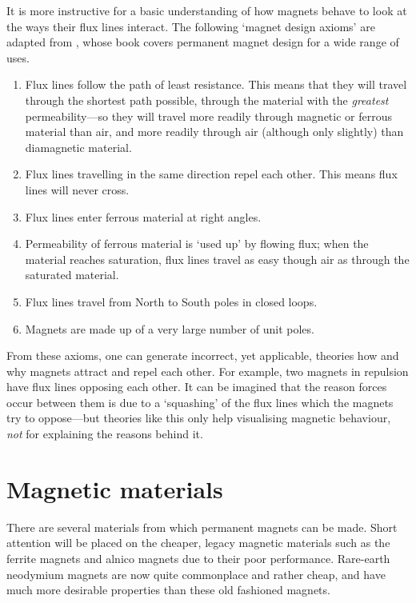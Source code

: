 It is more instructive for a basic understanding of how magnets behave
to look at the ways their flux lines interact. The following `magnet
design axioms' are adapted from \textcite{moskowitz1995}, whose book
covers permanent magnet design for a wide range of uses.

\begin{enumerate}
\item Flux lines follow the path of least resistance. This means that they will
travel through the shortest path possible,
through the material with the
\emph{greatest} permeability---so they will travel more readily through
magnetic or ferrous material than air, and more readily through air
(although only slightly) than diamagnetic material.

\item Flux lines travelling in the same direction repel each other. This means
flux lines will never cross.

\item Flux lines enter ferrous material at right angles.

\item Permeability of ferrous material is `used up' by flowing flux; when the
material reaches saturation, flux lines travel as easy though air as through
the saturated material.

\item Flux lines travel from North to South poles in closed loops.

\item Magnets are made up of a very large number of unit poles.
\end{enumerate}

From these axioms, one can generate incorrect, yet applicable,
theories how and why magnets attract and repel each other. For
example, two magnets in repulsion have flux lines opposing each
other. It can be imagined that the reason forces occur between them is
due to a `squashing' of the flux lines which the magnets try to
oppose---but theories like this only help visualising magnetic
behaviour, \emph{not} for explaining the reasons behind it.

\section{Magnetic materials}

There are several materials from which permanent magnets can be
made. Short attention will be placed on the cheaper, legacy magnetic
materials such as the ferrite magnets and alnico magnets due to their
poor performance. Rare-earth neodymium magnets are now quite
commonplace and rather cheap, and have much more desirable properties
than these old fashioned magnets.

